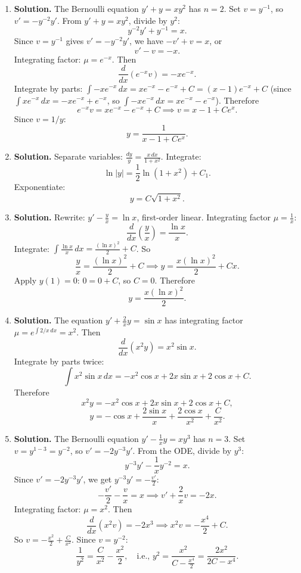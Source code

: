 \begin{enumerate}
\item \textbf{Solution.}
The Bernoulli equation $y'+y=xy^2$ has $n=2$. Set $v=y^{-1}$, so $v'=-y^{-2}y'$. From $y'+y=xy^2$, divide by $y^2$:
\[
y^{-2}y'+y^{-1}=x.
\]
Since $v=y^{-1}$ gives $v'=-y^{-2}y'$, we have $-v'+v=x$, or
\[
v'-v=-x.
\]
Integrating factor: $\mu=e^{-x}$. Then
\[
\frac{d}{dx}(e^{-x}v)=-xe^{-x}.
\]
Integrate by parts: $\int -xe^{-x}\,dx = xe^{-x}-e^{-x}+C = (x-1)e^{-x}+C$ (since $\int xe^{-x}\,dx = -xe^{-x}+e^{-x}$, so $\int -xe^{-x}\,dx = xe^{-x}-e^{-x}$). Therefore
\[
e^{-x}v = xe^{-x}-e^{-x}+C \implies v = x-1+Ce^{x}.
\]
Since $v=1/y$:
\[
\boxed{y = \frac{1}{x-1+Ce^x}}.
\]

\item \textbf{Solution.}
Separate variables: $\frac{dy}{y}=\frac{x\,dx}{1+x^2}$. Integrate:
\[
\ln|y|=\frac{1}{2}\ln(1+x^2)+C_1.
\]
Exponentiate:
\[
\boxed{y = C\sqrt{1+x^2}}.
\]

\item \textbf{Solution.}
Rewrite: $y'-\frac{y}{x}=\ln x$, first-order linear. Integrating factor $\mu=\frac{1}{x}$:
\[
\frac{d}{dx}\!\left(\frac{y}{x}\right)=\frac{\ln x}{x}.
\]
Integrate: $\int \frac{\ln x}{x}\,dx = \frac{(\ln x)^2}{2}+C$. So
\[
\frac{y}{x}=\frac{(\ln x)^2}{2}+C \implies y = \frac{x(\ln x)^2}{2}+Cx.
\]
Apply $y(1)=0$: $0=0+C$, so $C=0$. Therefore
\[
\boxed{y = \frac{x(\ln x)^2}{2}}.
\]

\item \textbf{Solution.}
The equation $y'+\frac{2}{x}y=\sin x$ has integrating factor $\mu=e^{\int 2/x\,dx}=x^2$. Then
\[
\frac{d}{dx}(x^2 y)=x^2\sin x.
\]
Integrate by parts twice:
\[
\int x^2\sin x\,dx = -x^2\cos x+2x\sin x+2\cos x+C.
\]
Therefore
\[
x^2 y = -x^2\cos x+2x\sin x+2\cos x+C,
\]
\[
\boxed{y = -\cos x+\frac{2\sin x}{x}+\frac{2\cos x}{x^2}+\frac{C}{x^2}}.
\]

\item \textbf{Solution.}
The Bernoulli equation $y'-\frac{1}{x}y=xy^3$ has $n=3$. Set $v=y^{1-3}=y^{-2}$, so $v'=-2y^{-3}y'$. From the ODE, divide by $y^3$:
\[
y^{-3}y'-\frac{1}{x}y^{-2}=x.
\]
Since $v'=-2y^{-3}y'$, we get $y^{-3}y'=-\frac{v'}{2}$:
\[
-\frac{v'}{2}-\frac{v}{x}=x \implies v'+\frac{2}{x}v=-2x.
\]
Integrating factor: $\mu=x^2$. Then
\[
\frac{d}{dx}(x^2 v)=-2x^3 \implies x^2v = -\frac{x^4}{2}+C.
\]
So $v=-\frac{x^2}{2}+\frac{C}{x^2}$. Since $v=y^{-2}$:
\[
\boxed{\frac{1}{y^2}=\frac{C}{x^2}-\frac{x^2}{2}}, \quad \text{i.e., } y^2 = \frac{x^2}{C - \frac{x^4}{2}} = \frac{2x^2}{2C-x^4}.
\]


\end{enumerate}
